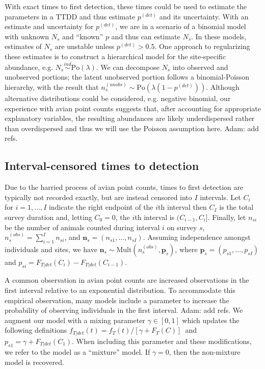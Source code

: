 \documentclass[useAMS,usenatbib,referee,12pt]{article}
\newcommand{\jarad}[1]{{\color{Orange} #1}}
\newcommand{\vn}{\textbf{n}}
\newcommand{\vp}{\textbf{p}}
\newcommand{\Po}{\mbox{Po}}
\newcommand{\Mult}{\mbox{Mult}}
\begin{document}
With exact times to first detection, these times could be used to estimate the parameters in a TTDD and thus estimate $p^{(det)}$ and its uncertainty. 
With an estimate and uncertainty for $p^{(det)}$, we are in a scenario of a binomial model with unknown $N_s$ and ``known'' $p$ and thus can estimate $N_s$.
In these models, estimates of $N_s$ are unstable unless $p^{(det)}>0.5$.
One approach to regularizing these estimates is to construct a hierarchical model for the site-specific abundance, e.g. $N_s\stackrel{ind}{\sim} \Po(\lambda)$. 
We can decompose $N_{s}$ into observed and unobserved portions; the latent unobserved portion follows a binomial-Poisson hierarchy, with the result that $n_{s}^{(unobs)} \sim \Po\left(\lambda(1-p^{(det)})\right)$.  
Although alternative distributions could be considered, e.g. negative binomial, our experience with avian point counts suggests that, after accounting for appropriate explanatory variables, the resulting abundances are likely underdispersed rather than overdispersed and thus we will use the Poisson assumption here. 
\jarad{Adam: add refs.}


\subsection{Interval-censored times to detection}

Due to the harried process of avian point counts, times to first detection are typically not recorded exactly, but are instead censored into $I$ intervals. 
Let $C_i$ for $i=1,\dots,I$ indicate the right endpoint of the $i$th interval then $C_I$ is the total survey duration and, letting $C_0=0$, the $i$th interval is $(C_{i-1},C_{i}]$. 
Finally, let $n_{si}$ be the number of animals counted during interval $i$ on survey $s$, $n_{s}^{(obs)} = \sum_{i=1}^I n_{si}$, and $\vn_{s}=(n_{s1},\dots,n_{sI})$.
Assuming independence amongst individuals and sites, we have $\vn_{s} \sim \Mult \left(n_{s}^{(obs)}, \vp_{s}\right)$, where $\vp_{s}=(p_{s1},\dots,p_{sI})$ and $p_{si} = F_{T|det}(C_i) - F_{T|det}(C_{i-1})$.  

A common observation in avian point counts are increased observations in the first interval relative to an exponential distribution.
To accommodate this empirical observation, many models include a parameter to increase the probability of observing individuals in the first interval. \jarad{Adam: add refs.}
We augment our model with a mixing parameter $\gamma\in[0,1]$ which updates the following definitions
$f_{T|det}(t) = f_T(t)/[\gamma+F_T(C)]$\ and $p_{s1} = \gamma + F_{T|det}(C_1)$.
When including this parameter and these modifications, we refer to the model as a ``mixture'' model. 
If $\gamma=0$, then the non-mixture model is recovered.
\end{document}
